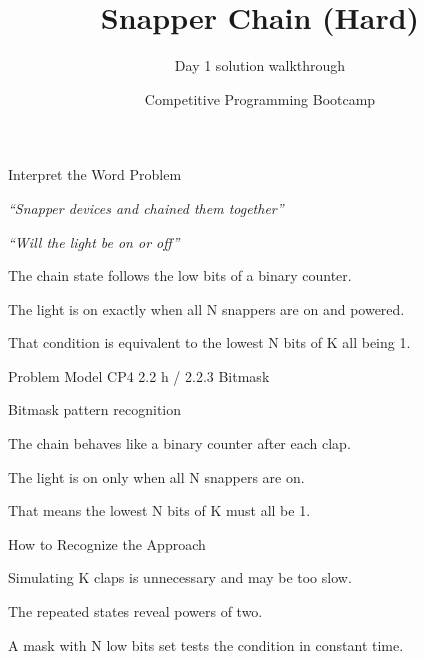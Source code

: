 \documentclass[aspectratio=169,11pt]{beamer}
\title[snapperhard]{Snapper Chain (Hard)}
\subtitle{Day 1 solution walkthrough}
\author[Solution Deck]{Competitive Programming Bootcamp}
\date{}
\begin{document}
\begin{frame}[plain]
  \titlepage
\end{frame}

\begin{frame}{Interpret the Word Problem}
\small
{}
\begin{tightitemize}
  \item \textit{``Snapper devices and chained them together''}
  \item \textit{``Will the light be on or off''}
\end{tightitemize}

\vspace{0.18cm}
\begin{tightitemize}
  \item The chain state follows the low bits of a binary counter.
  \item The light is on exactly when all N snappers are on and powered.
  \item That condition is equivalent to the lowest N bits of K all being 1.
\end{tightitemize}
\end{frame}







\begin{frame}{Problem Model}
\small
{} CP4 2.2 h / 2.2.3 Bitmask

\vspace{0.25cm}
 Bitmask pattern recognition

\vspace{0.25cm}
\begin{tightitemize}
  \item The chain behaves like a binary counter after each clap.
  \item The light is on only when all N snappers are on.
  \item That means the lowest N bits of K must all be 1.
\end{tightitemize}
\end{frame}

\begin{frame}{How to Recognize the Approach}
\begin{tightitemize}
  \item Simulating K claps is unnecessary and may be too slow.
  \item The repeated states reveal powers of two.
  \item A mask with N low bits set tests the condition in constant time.
\end{tightitemize}
\end{frame}
\end{document}
